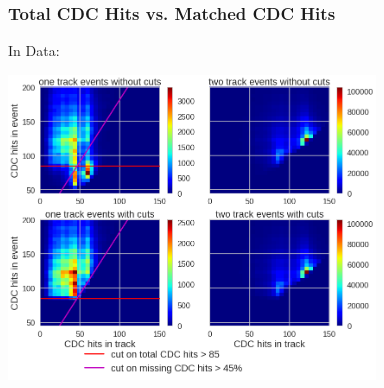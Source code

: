 \documentclass[18pt]{beamer}
\begin{document}
  \begin{frame}
    \frametitle{Total CDC Hits vs. Matched CDC Hits}
    \large In Data:\\
    \begin{center}
      \includegraphics[width=0.73\textwidth]{figures/hitcontent_2dhist_data.png}
    \end{center}
  \end{frame}
\end{document}
